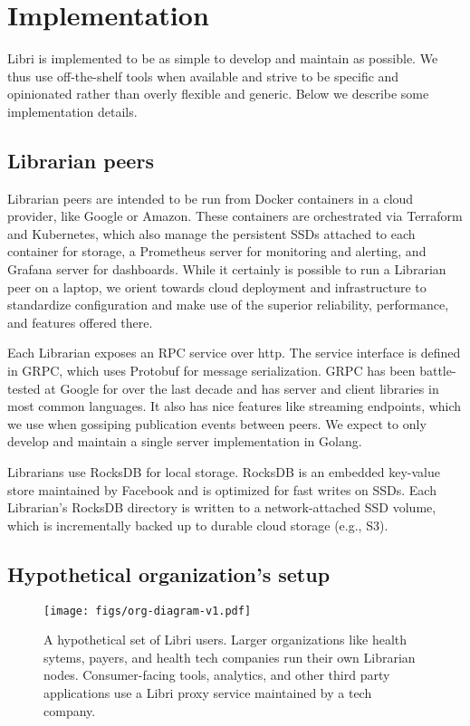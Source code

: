 \documentclass[10pt]{article}
\begin{document}
\section{Implementation}
\label{sec:impl}

Libri is implemented to be as simple to develop and maintain as possible. We thus use off-the-shelf tools when available and strive to be specific and opinionated rather than overly flexible and generic. Below we describe some implementation details. 

\subsection{Librarian peers}
Librarian peers are intended to be run from Docker containers in a cloud provider, like Google or Amazon. These containers are orchestrated via Terraform and Kubernetes, which also manage the persistent SSDs attached to each container for storage, a Prometheus server for monitoring and alerting, and Grafana server for dashboards. While it certainly is possible to run a Librarian peer on a laptop, we orient towards cloud deployment and infrastructure to standardize configuration and make use of the superior reliability, performance, and features offered there. 

Each Librarian exposes an RPC service over http. The service interface is defined in GRPC, which uses Protobuf for message serialization. GRPC has been battle-tested at Google for over the last decade and has server and client libraries in most common languages. It also has nice features like streaming endpoints, which we use when gossiping publication events between peers. We expect to only develop and maintain a single server implementation in Golang. 

Librarians use RocksDB for local storage. RocksDB is an embedded key-value store maintained by Facebook and is optimized for fast writes on SSDs. Each Librarian's RocksDB directory is written to a network-attached SSD volume, which is incrementally backed up to durable cloud storage (e.g., S3). 


\subsection{Hypothetical organization's setup}

\begin{figure}[tp]
	\centering
	\texttt{[image: figs/org-diagram-v1.pdf]}
	\caption{A hypothetical set of Libri users. Larger organizations like health sytems, payers, and health tech companies run their own Librarian nodes. Consumer-facing tools, analytics, and other third party applications use a Libri proxy service maintained by a tech company.}
	\label{fig:org-setup}
\end{figure}
\end{document}
